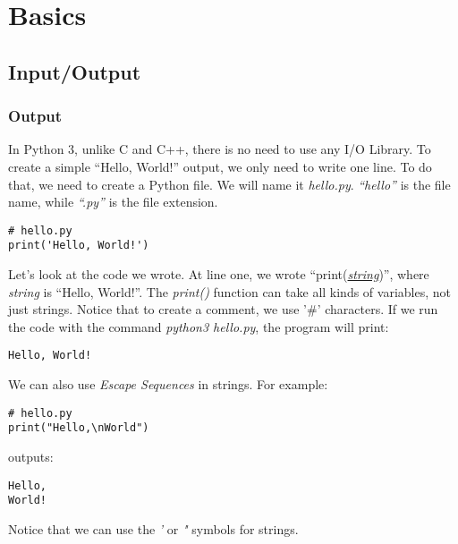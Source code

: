 \chapter{Basics}
\section*{Input/Output}
\subsection*{Output}
In Python 3, unlike C and C++, there is no need to use any I/O Library.
To create a simple ``Hello, World!'' output, we only need to write one line.
To do that, we need to create a Python file. We will name it \emph{hello.py}.
\emph{``hello''} is the file name, while \emph{``.py''} is the file extension.
\begin{lstlisting}
# hello.py
print('Hello, World!')
\end{lstlisting}
Let's look at the code we wrote.
At line one, we wrote ``print(\emph{\hyperref[subsec:strings]{string}})'', where \emph{string} is ``Hello, World!''.
The \emph{print()} function can take all kinds of variables, not just strings.
Notice that to create a comment, we use '\#' characters.
If we run the code with the command \emph{python3 hello.py}, the program will print:
\begin{lstlisting}[language=Text]
Hello, World!
\end{lstlisting}
We can also use \emph{Escape Sequences} in strings. For example:
\begin{lstlisting}
# hello.py
print("Hello,\nWorld")
\end{lstlisting}
outputs:
\begin{lstlisting}[language=Text]
Hello,
World!
\end{lstlisting}
Notice that we can use the \emph{'} or \emph{"} symbols for strings.
